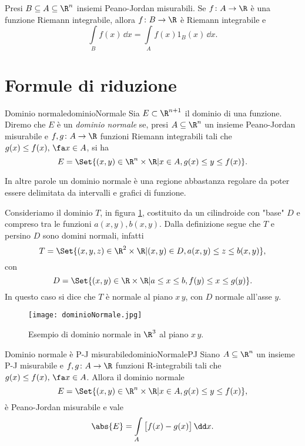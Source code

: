 \begin{oss}
	Presi \(B\subseteq A \subseteq \R^n\) insiemi Peano-Jordan misurabili.
	Se \(f\colon A\to \R\) è una funzione Riemann integrabile, allora \(f\colon B\to \R\) è Riemann integrabile e
	\[
		\int\limits_B f(x)\,\dd x = \int\limits_A f(x) 1_B(x)\,\dd x.
	\]
\end{oss}
\section{Formule di riduzione}

\begin{defn}{Dominio normale}{dominioNormale}
	Sia \(E\subset \R^{n+1}\) il dominio di una funzione.
	Diremo che \(E\) è un \emph{dominio normale} se, presi \(A\subseteq \R^n\) un insieme Peano-Jordan misurabile e \(f,g\colon A \to \R\) funzioni Riemann integrabili tali che \(g(x) \le f(x),\,\fa x\in A\), si ha
	\[
		E = \Set{(x,y) \in \R^n \times \R | x\in A, g(x) \le y \le f(x)}.
	\]
\end{defn}

\begin{oss}
	In altre parole un dominio normale è una regione abbastanza regolare da poter essere delimitata da intervalli e grafici di funzione.
\end{oss}

\begin{ese}
	Consideriamo il dominio \(T\), in figura \ref{fig:dominioNormale}, costituito da un cilindroide con "base" \(D\) e compreso tra le funzioni \(a(x,y),b(x,y)\).
	Dalla definizione segue che \(T\) e persino \(D\) sono domini normali, infatti
	\[
		T = \Set{(x,y,z) \in \R^2 \times \R | (x,y) \in D, a(x,y) \le z \le b(x,y)},
	\]
	con
	\[
		D = \Set{(x,y) \in \R \times \R | a \le x \le b, f(y) \le x \le g(y)}.
	\]
	In questo caso si dice che \(T\) è normale al piano \(x\,y\), con \(D\) normale all'asse \(y\).
\end{ese}

\begin{figure}[tp]
	\begin{centering}
		\texttt{[image: dominioNormale.jpg]}
		\caption{Esempio di dominio normale in \(\R^3\) al piano \(x\,y\).}
		\label{fig:dominioNormale}
	\end{centering}
\end{figure}

\begin{prop}{Dominio normale è P-J misurabile}{dominioNormalePJ}
	Siano \(A\subseteq \R^n\) un insieme P-J misurabile e \(f,g\colon A \to \R\) funzioni R-integrabili tali che \(g(x) \le f(x),\,\fa x\in A\).
	Allora il dominio normale
	\[
		E = \Set{(x,y) \in \R^n \times \R | x\in A, g(x) \le y \le f(x)},
	\]
	è Peano-Jordan misurabile e vale
	\[
		\abs{E} = \int\limits_A \big[f(x)-g(x)\big]\,\dd x.
	\]
\end{prop}

